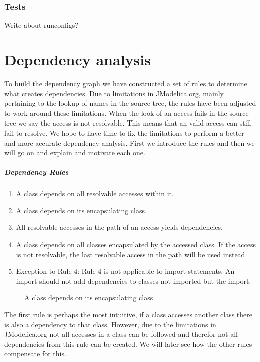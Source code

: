 \documentclass{cslthse-msc}
\begin{document}
\subsection{Tests}
    Write about runconfigs?

\chapter[Dependency analysis]{Dependency analysis}
To build the dependency graph we have constructed a set of rules to determine what creates dependencies. Due to limitations in JModelica.org, mainly pertaining to the lookup of names in the source tree, the rules have been adjusted to work around these limitations. When the look of an access fails in the source tree we say the access is not resolvable. This means that an valid access can still fail to resolve. We hope to have time to fix the limitations to perform a better and more accurate dependency analysis. First we introduce the rules and then we will go on and explain and motivate each one.

\paragraph{Dependency Rules}
\begin{enumerate}
\item A class depends on all resolvable accesses within it.
\item A class depends on its encapsulating class. 
\item All resolvable accesses in the path of an access yields dependencies.
\item A class depends on all classes encapsulated by the accessed class. If the access is not resolvable, the last resolvable access in the path will be used instead.
\item Exception to Rule 4: Rule 4 is not applicable to import statements. An import should not add dependencies to classes not imported but the import.
\end{enumerate}


\begin{figure}[!htbp]
    \centering
    \qquad
    \subfloat{\raisebox{3.2 cm}{}}
    \caption{A class depends on its encapsulating class}
    \label{fig:parentGraph}
\end{figure}

The first rule is perhaps the most intuitive, if a class accesses another class there is also a dependency to that class. However, due to the limitations in JModelica.org not all accesses in a class can be followed and therefor not all dependencies from this rule can be created. We will later see how the other rules compensate for this. 
\end{document}
